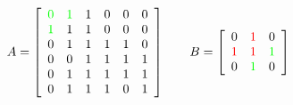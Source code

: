 \documentclass[varwidth=true]{standalone}
\newcommand{\tikzmark}[2]{\tikz[overlay,remember picture,baseline=(#1.base)] \node (#1) {#2};}
\begin{document}
\[
	A = \left[\begin{array}{*6{c}}
    \color{green}{0} & \color{green}{1} & 1 & 0 & 0 & 0 \\
    \color{green}{1} & 1 & 1 & 0 & 0 & 0 \\
    0 & 1 & 1 & 1 & 1 & 0 \\
    0 & 0 & 1 & 1 & 1 & 1 \\
    0 & 1 & 1 & 1 & 1 & 1  \\
    0 & 1 & 1 & 1 & 0 & 1 
  \end{array}\right]
  \qquad
  B  = \left[\begin{array}{*3{c}}
    \tikzmark{left}{0} & \color{red}{1} & 0\\
    \color{red}{1} & \color{red}{1} & \color{green}{1} \\
    0 & \color{green}{1} & \tikzmark{right}{0}
  \end{array}\right]
\]

\end{document}
